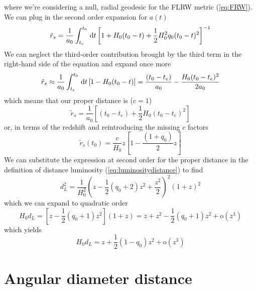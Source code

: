 where we're considering a null, radial geodesic for the FLRW metric (\ref{eq:FRW}). We can plug in the second order expansion for $a(t)$
\begin{equation}
    \tilde{r}_{s} = \frac{1}{a_{0}}\int_{t_{e}}^{t_{0}}\,\text{d}t\left[1+H_{0}(t_{0}-t)+\frac{1}{2}H_{0}^{2}q_{0}(t_{0}-t)^{2}\right]^{-1}
\end{equation}
We can neglect the third-order contribution brought by the third term in the right-hand side of the equation and expand once more 
\begin{equation}
    \tilde{r}_{s} \approx \frac{1}{a_{0}}\int_{t_{e}}^{t_{0}}\,\text{d}t\left[1-H_{0}(t_{0}-t)\right] = \frac{(t_{0}-t_{e})}{a_{0}} - \frac{H_{0}(t_{0}-t_{e})^{2}}{2a_{0}}
\end{equation}
which means that our proper distance is ($c=1$)
\begin{equation}
    \tilde{r}_{s} = \frac{1}{a_{0}}\left[(t_{0}-t_{e})+\frac{1}{2}H_{0}(t_{0}-t_{e})^{2}\right]
\end{equation}
or, in terms of the redshift and reintroducing the missing $c$ factors
\begin{equation}
    \tilde{r}_{s}(t_{0}) = \frac{c}{H_{0}}z\left[1-\frac{(1+q_{0})}{2}z\right]
    \label{eq:properdistance_rs_second}
\end{equation}
We can substitute the expression at second order for the proper distance in the definition of distance luminosity (\ref{eq:luminositydistance}) to find 
\begin{equation}
    d_{L}^{2} = \frac{1}{H_{0}^{2}}\left(z-\frac{1}{2}(q_{0}+2)z^{2}+\frac{z^{2}}{2}\right)^{2}(1+z)^{2}
\end{equation}
which we can expand to quadratic order 
\begin{equation}
    H_{0}d_{L} = \left[z-\frac{1}{2}(q_{0}+1)z^{2}\right](1+z) = z+z^{2}-\frac{1}{2}(q_{0}+1)z^{2} + \text{o}(z^{3})
\end{equation}
which yields
\begin{equation}
    \boxed{
    H_{0}d_{L} = z + \frac{1}{2}(1-q_{0})z^{2} + \text{o}(z^{3})
    }
\end{equation}

\section{Angular diameter distance}


